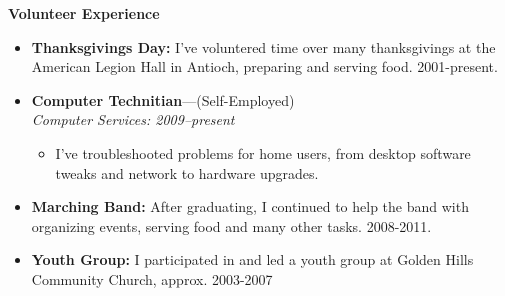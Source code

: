 \documentclass[11pt,oneside]{article}
\newenvironment{ressection}[1]{
	\vspace{4pt}
	{\textbf{\LARGE {\bigtxt #1}}}
	\begin{itemize}
	\vspace{2pt}
}{
	\end{itemize}
}
\newcommand{\resitem}[1]{
	\vspace{2.1pt}
	\item \begin{flushleft} #1 \end{flushleft}
}
\newcommand{\ressubitem}[1]{
	\vspace{-2pt}
	\item \begin{flushleft} #1 \end{flushleft}
}
\newcommand{\resbigitem}[3]{
	\vspace{-5pt}
	\item
	\textbf{#1}---#2 \\
	\textit{#3}
}
\newenvironment{ressubsec}[3]{
	\resbigitem{#1}{#2}{#3}
	\vspace{-4pt}
	\begin{itemize}
}{
	\end{itemize}
}
\begin{document}
\begin{ressection}{Volunteer Experience}

    \resitem{\textbf{Thanksgivings Day:} I've voluntered time over many thanksgivings at the American Legion Hall in Antioch, preparing and serving food. 2001-present.}	
    \begin{ressubsec}{Computer Technitian}{(Self-Employed)}{Computer Services: 2009--present}
		\ressubitem{I've troubleshooted problems for home users, from desktop software tweaks and network to hardware upgrades.}
	\end{ressubsec}

    \resitem{\textbf{Marching Band:} After graduating, I continued to help the band with organizing events, serving food and many other tasks. 2008-2011.}
    \resitem{\textbf{Youth Group:} I participated in and led a youth group at Golden Hills Community Church, approx. 2003-2007}


\end{ressection}



%
%
%
%
%


\end{document}
